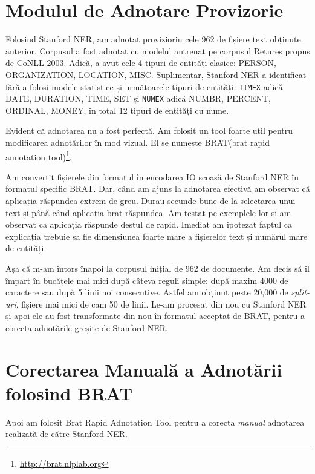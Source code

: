 
\section{Modulul de Adnotare Provizorie}

Folosind Stanford NER, am adnotat provizioriu cele 962 de fișiere text obținute anterior. Corpusul a fost adnotat cu modelul antrenat pe corpusul Retures propus de CoNLL-2003. Adică, a avut cele 4 tipuri de entități clasice: PERSON, ORGANIZATION, LOCATION, MISC. Suplimentar, Stanford NER a identificat fără a folosi modele statistice și următoarele tipuri de entități: \texttt{TIMEX} adică DATE, DURATION, TIME, SET și \texttt{NUMEX} adică NUMBR, PERCENT, ORDINAL, MONEY, în total 12 tipuri de entități cu nume.

Evident că adnotarea nu a fost perfectă. Am folosit un tool foarte util pentru modificarea adnotărilor în mod vizual. El se numește BRAT(brat rapid annotation tool)\footnote{\url{http://brat.nlplab.org}}.

Am convertit fișierele din formatul în encodarea IO scoasă de Stanford NER în formatul specific BRAT. Dar, când am ajuns la adnotarea efectivă am observat că aplicația răspundea extrem de greu. Durau secunde bune de la selectarea unui text și până când aplicația brat răspundea. Am testat pe exemplele lor și am observat ca aplicația răspunde destul de rapid. Imediat am ipotezat faptul ca explicația trebuie să fie dimensiunea foarte mare a fișierelor text și numărul mare de entități.

Așa că m-am întors înapoi la corpusul inițial de 962 de documente. Am decis să îl împart în bucățele mai mici după câteva reguli simple: după maxim 4000 de caractere sau după 5 linii noi consecutive. Astfel am obținut peste 20,000 de \textit{split-uri}, fișiere mai mici de cam 50 de linii. Le-am procesat din nou cu Stanford NER și apoi ele au fost transformate din nou în formatul acceptat de BRAT, pentru a corecta adnotările greșite de Stanford NER.

\section{Corectarea Manuală a Adnotării folosind BRAT}
\label{section:brat-annotation}

Apoi am folosit Brat Rapid Adnotation Tool pentru a corecta \textit{manual} adnotarea realizată de către Stanford NER.


